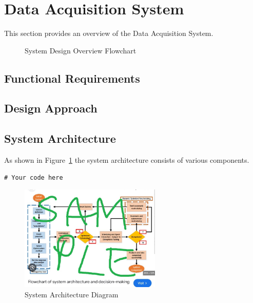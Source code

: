 \section{Data Acquisition System}
This section provides an overview of the Data Acquisition System.

\begin{figure}[H]
    \centering
    \scalebox{0.8}{ %
    }
    \caption{System Design Overview Flowchart}
    \label{fig:decriptiveLabel22} %
\end{figure}


\subsection{Functional Requirements}

\subsection{Design Approach}

\subsection{System Architecture}
As shown in Figure~\ref{fig:decriptiveLabel22} the system architecture consists of various components.

\begin{lstlisting}[style=cstyle, caption=System Architecture Code Example, label=lst:SystemArchitecture8]
# Your code here
\end{lstlisting}

\begin{figure}[htbp] %
    \centering
    \includegraphics[width=0.6\textwidth]{figures/methodology/system_architecture.jpg}
    \caption{System Architecture Diagram}
    \label{fig:system-architecture3}
\end{figure}

